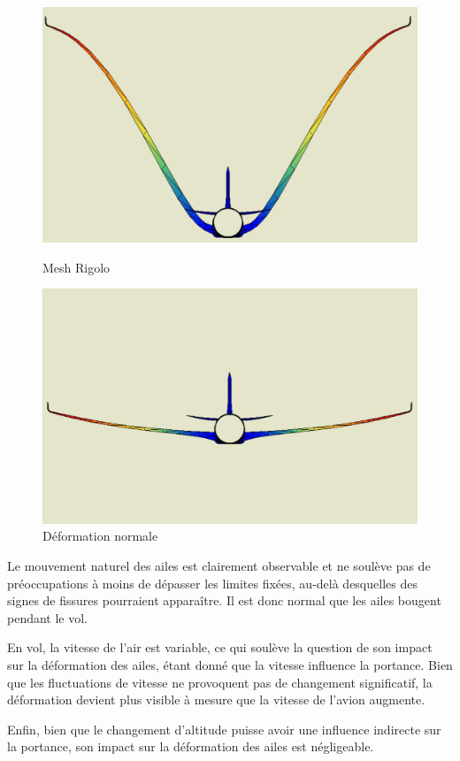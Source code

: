 \documentclass{article}
\begin{document}
\begin{figure}[h]
  \centering
  \begin{minipage}[h]{0.4\textwidth}
    \includegraphics[scale=0.11]{udef.jpg}
    \caption{Mesh Rigolo}
    \label{fig:mesh_rigolo}
  \end{minipage}
  \hfill
  \begin{minipage}[h]{0.4\textwidth}
    \includegraphics[scale=0.11]{normal_def.jpg}
        \caption{Déformation normale}
        \label{fig:mesh_normal}
  \end{minipage}
\end{figure}

Le mouvement naturel des ailes est clairement observable et ne soulève pas de préoccupations à moins de dépasser les limites fixées, au-delà desquelles des signes de fissures pourraient apparaître. Il est donc normal que les ailes bougent pendant le vol.

En vol, la vitesse de l'air est variable, ce qui soulève la question de son impact sur la déformation des ailes, étant donné que la vitesse influence la portance. Bien que les fluctuations de vitesse ne provoquent pas de changement significatif, la déformation devient plus visible à mesure que la vitesse de l'avion augmente.

Enfin, bien que le changement d'altitude puisse avoir une influence indirecte sur la portance, son impact sur la déformation des ailes est négligeable.
\end{document}
